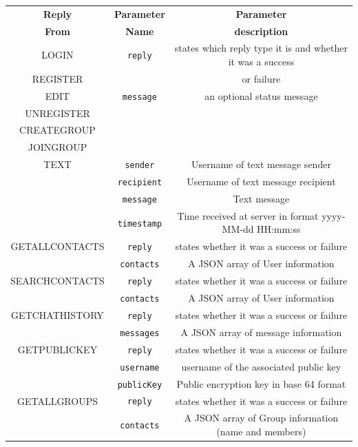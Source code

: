 \begin{table}[H]
        \centering
        \small
        \setlength\tabcolsep{5pt}
\scriptsize
\begin{tabular}{ |c|c|c| } 
 \hline
 \textbf{Reply} & \textbf{Parameter} & \textbf{Parameter} \\
 \textbf{From} & \textbf{Name} & \textbf{description} \\
 \hline
 LOGIN & \verb|reply| & states which reply type it is and whether it was a success\\ 
 REGISTER &  &   or failure  \\ 
 EDIT & \verb|message| & an optional status message  \\ 
 UNREGISTER &  &  \\  
 CREATEGROUP &  &  \\  
 JOINGROUP &  &  \\  
  \hline
  TEXT & \verb|sender| & Username of text message sender  \\
  &\verb|recipient|& Username of text message recipient \\ 
  & \verb|message| & Text message   \\ 
   & \verb|timestamp| & Time received at server in format yyyy-MM-dd HH:mm:ss \\ 
  \hline
 GETALLCONTACTS & \verb|reply| &  states whether it was a success or failure \\ 
  & \verb|contacts| &  A JSON array of User information \\ 
  \hline
 SEARCHCONTACTS & \verb|reply| &  states whether it was a success or failure \\ 
  & \verb|contacts| &  A JSON array of User information \\ 
  \hline
 GETCHATHISTORY & \verb|reply| &  states whether it was a success or failure \\ 
  & \verb|messages| &  A JSON array of message information \\ 
  \hline
 GETPUBLICKEY & \verb|reply| &  states whether it was a success or failure \\ 
  & \verb|username| &  username of the associated public key \\ 
  & \verb|publicKey| &  Public encryption key in base 64 format \\ 
  \hline
 GETALLGROUPS & \verb|reply| &  states whether it was a success or failure \\ 
  & \verb|contacts| &  A JSON array of Group information (name and members) \\ 
  \hline

\end{tabular}
\end{table}
